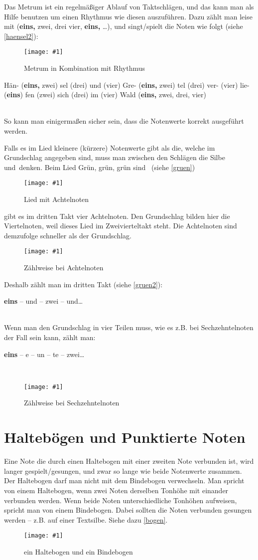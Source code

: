 \documentclass[10pt,a4paper,twoside]{report}
\newcommand{\comment}[1]{
	\marginpar{
		\textsf{#1}
	}
}
\newcommand{\image}[4]{
	\begin{figure}[!ht]
		\centering
		\texttt{[image: \#1]}
		\caption{#2}
		\label{#3}
	\end{figure}
}
\newcommand{\myquote}[1]{
	\hspace{15mm}
	\parbox{100mm}{
		#1
	}
	\ \\
}
\begin{document}
Das Metrum ist ein regelmäßiger Ablauf von Taktschlägen,
und das kann man als Hilfe benutzen um einen Rhythmus wie diesen auszuführen.
Dazu zählt man leise mit (\textbf{eins,} zwei, drei vier, \textbf{eins,} \dots),
und singt/spielt die Noten wie folgt (siehe \autoref{haensel2}):
\image{lilypond/haensel2.png}{Metrum in Kombination mit Rhythmus}{haensel2}{10}

\myquote{
	Hän- {\footnotesize (\textbf{eins,} zwei)} sel {\footnotesize (drei)} und 
	{\footnotesize (vier)} Gre- {\footnotesize (\textbf{eins,} zwei)}
	tel {\footnotesize (drei)} ver- {\footnotesize (vier)} lie- 
	{\footnotesize (\textbf{eins})} fen {\footnotesize (zwei)} sich 
	{\footnotesize (drei)} im {\footnotesize (vier)}
	Wald {\footnotesize (\textbf{eins,} zwei, drei, vier)}
}

So kann man einigermaßen sicher sein, dass die Notenwerte korrekt ausgeführt 
werden.

Falls es im Lied kleinere (kürzere) Notenwerte gibt als die, welche im Grundschlag 
angegeben sind, muss man zwischen den Schlägen die Silbe \glqq und\grqq\ denken. 
Beim Lied \glqq Grün, grün, grün sind \textellipsis\grqq\ (siehe \autoref{gruen})
\image{lilypond/gruen.png}{Lied mit Achtelnoten}{gruen}{10}
gibt es im dritten Takt vier Achtelnoten. Den Grundschlag bilden hier die 
Viertelnoten, weil dieses Lied im Zweivierteltakt steht. Die Achtelnoten sind 
demzufolge schneller als der Grundschlag.
\image{lilypond/gruen2.png}{Zählweise bei Achtelnoten}{gruen2}{11}
Deshalb zählt man im dritten Takt (siehe \autoref{gruen2}):

\myquote{\textbf{eins} -- und -- zwei -- und\dots}

Wenn man den Grundschlag in vier Teilen muss, wie es z.B. bei Sechzehntelnoten der
Fall sein kann, zählt man: 

\myquote{\textbf{eins} -- e -- un -- te -- zwei\dots}

\image{lilypond/sechzehn.png}{Zählweise bei Sechzehntelnoten}{sechzehn}{7}

\section{Haltebögen und Punktierte Noten}
Eine Note die durch einen Haltebogen mit einer zweiten Note verbunden ist,
wird langer gespielt/gesungen, und zwar so lange wie beide Notenwerte zusammen.
Der Haltebogen\comment{Haltebogen} darf man nicht mit dem Bindebogen verwechseln.
Man spricht von einem Haltebogen, wenn zwei Noten derselben Tonhöhe mit einander
verbunden werden. Wenn beide Noten unterschiedliche Tonhöhen aufweisen, spricht man
von einem Bindebogen. Dabei sollten die Noten verbunden gesungen werden -- 
z.B. auf einer Textsilbe. Siehe dazu \autoref{bogen}.
\image{lilypond/bogen.png}{ein Haltebogen und ein Bindebogen}{bogen}{6}
\end{document}

